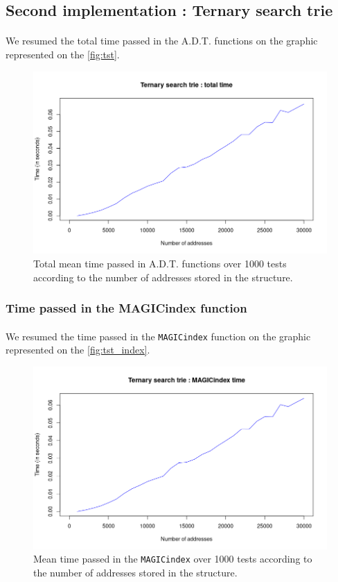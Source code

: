 \documentclass[a4paper, 11pt, oneside]{article}
\begin{document}
\subsection{Second implementation : Ternary search trie}
\paragraph{}We resumed the total time passed in the A.D.T. functions on the graphic represented on the \autoref{fig:tst}. 
\begin{figure}[H]
  \centering
  \includegraphics[scale=0.6]{plots/tst_total.png} 
  \caption{Total mean time passed in A.D.T. functions over 1000 tests according to the number of addresses stored in the structure.}\label{fig:tst}
\end{figure}
\subsubsection{Time passed in the MAGICindex function}
\paragraph{}We resumed the time passed in the \texttt{MAGICindex} function on the graphic represented on the \autoref{fig:tst_index}. 
\begin{figure}[H]
  \centering
  \includegraphics[scale=0.6]{plots/tst_index.png} 
  \caption{Mean time passed in the \texttt{MAGICindex} over 1000 tests according to the number of addresses stored in the structure.}\label{fig:tst_index}
\end{figure}
\end{document}

